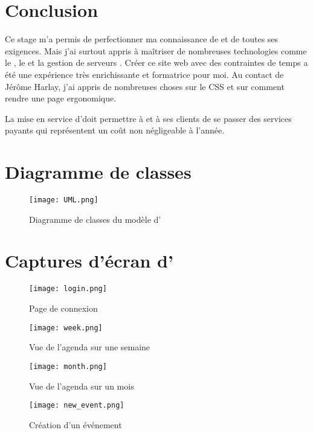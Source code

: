 \documentclass[a4paper, 11pt]{report}
\begin{document}
\chapter{Conclusion}
    Ce stage m'a permis de perfectionner ma connaissance de \symfony et de toutes ses exigences. Mais j'ai surtout appris à maîtriser de nombreuses technologies comme le \js, le \jq et la gestion de serveurs \njs. Créer ce site web avec des contraintes de temps a été une expérience très enrichissante et formatrice pour moi. Au contact de Jérôme Harlay, j'ai appris de nombreuses choses sur le CSS et sur comment rendre une page ergonomique.

    La mise en service d'\agenda doit permettre à \lgk et à ses clients de se passer des services payants qui représentent un coût non négligeable à l'année.

\appendix
    \chapter{Diagramme de classes}
    \begin{figure}[!ht]
        \centerline{\texttt{[image: UML.png]}}
        \caption{Diagramme de classes du modèle d'\agenda}
        \label{modele}
    \end{figure}
    \chapter{Captures d'écran d'\agenda}

    \begin{figure}[!ht]
        \centerline{\texttt{[image: login.png]}}
        \caption{Page de connexion}
        \label{login}
    \end{figure}

    \begin{figure}[!ht]
        \centerline{\texttt{[image: week.png]}}
        \caption{Vue de l'agenda sur une semaine}
        \label{week}
    \end{figure}

    \begin{figure}[!ht]
        \centerline{\texttt{[image: month.png]}}
        \caption{Vue de l'agenda sur un mois}
        \label{month}
    \end{figure}

    \begin{figure}[!ht]
        \centerline{\texttt{[image: new\_event.png]}}
        \caption{Création d'un événement}
        \label{new_event}
    \end{figure}
\end{document}
